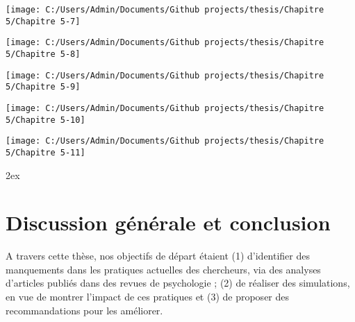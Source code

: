 \documentclass[
  12pt,
  french,
]{article}
\begin{document}
\begin{center}\texttt{[image: C:/Users/Admin/Documents/Github projects/thesis/Chapitre 5/Chapitre 5-7]} \end{center}

\begin{center}\texttt{[image: C:/Users/Admin/Documents/Github projects/thesis/Chapitre 5/Chapitre 5-8]} \end{center}

\begin{center}\texttt{[image: C:/Users/Admin/Documents/Github projects/thesis/Chapitre 5/Chapitre 5-9]} \end{center}

\begin{center}\texttt{[image: C:/Users/Admin/Documents/Github projects/thesis/Chapitre 5/Chapitre 5-10]} \end{center}

\begin{center}\texttt{[image: C:/Users/Admin/Documents/Github projects/thesis/Chapitre 5/Chapitre 5-11]} \end{center}

\parindent 0pt
\renewcommand{\notesname}{Notes de fin de chapitre}

\parskip 2ex \theendnotes \newpage

\hypertarget{discussion-guxe9nuxe9rale-et-conclusion}{%
\section{Discussion générale et
conclusion}\label{discussion-guxe9nuxe9rale-et-conclusion}}

A travers cette thèse, nos objectifs de départ étaient (1) d'identifier
des manquements dans les pratiques actuelles des chercheurs, via des
analyses d'articles publiés dans des revues de psychologie ; (2) de
réaliser des simulations, en vue de montrer l'impact de ces pratiques et
(3) de proposer des recommandations pour les améliorer.
\end{document}
